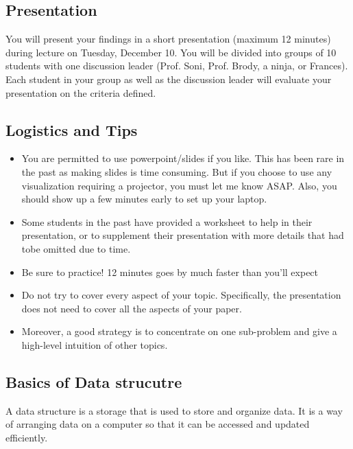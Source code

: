 \documentclass[conference]{IEEEtran}
\begin{document}
\subsection{Presentation}\label{AA}
You will present your findings in a short presentation (maximum 12 minutes) during lecture on Tuesday, December 10. You will be divided into groups of 10 students with one discussion leader (Prof. Soni, Prof. Brody, a ninja, or Frances). Each student in your group as well as the discussion leader will evaluate your presentation on the criteria defined.

\subsection{Logistics and Tips}
\begin{itemize}
\item You are permitted to use powerpoint/slides if you like. This has been rare in the past as making slides is time consuming. But if you choose to use any visualization requiring a projector, you must let me know ASAP. Also, you should show up a few minutes early to set up your laptop.
\item Some students in the past have provided a worksheet to help in their presentation, or to supplement their presentation with more details that had tobe omitted due to time.
\item Be sure to practice! 12 minutes goes by much faster than you'll expect
\item Do not try to cover every aspect of your topic. Specifically, the presentation does not need to cover all the aspects of your paper.
\item Moreover, a good strategy is to concentrate on one sub-problem and give a high-level intuition of other topics.
\end{itemize}

\subsection{Basics of Data strucutre}
A data structure is a storage that is used to store and organize data. It is a way of arranging data on a computer so that it can be accessed and updated efficiently.
\end{document}
